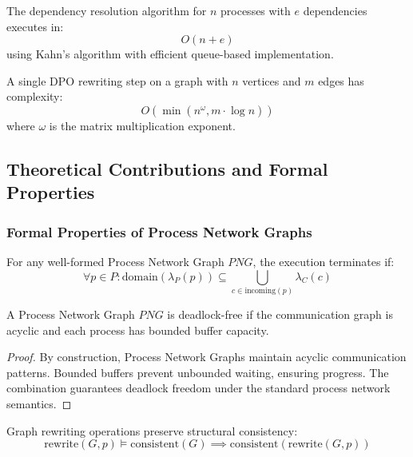 \documentclass[11pt,a4paper]{article}
\begin{document}
\begin{theorem}
The dependency resolution algorithm for $n$ processes with $e$ dependencies executes in:
\[
O(n + e)
\]
using Kahn's algorithm with efficient queue-based implementation.
\end{theorem}

\begin{theorem}
A single DPO rewriting step on a graph with $n$ vertices and $m$ edges has complexity:
\[
O\left(\min\left(n^{\omega}, m \cdot \log n\right)\right)
\]
where $\omega$ is the matrix multiplication exponent.
\end{theorem}

\subsection{Theoretical Contributions and Formal Properties}
\label{subsec:theoretical_contributions}

\subsubsection{Formal Properties of Process Network Graphs}
\label{subsubsec:formal_properties}

\begin{theorem}
For any well-formed Process Network Graph $PNG$, the execution terminates if:
\[
\forall p \in P: \text{domain}(\lambda_P(p)) \subseteq \bigcup_{c \in \text{incoming}(p)} \lambda_C(c)
\]
\end{theorem}

\begin{theorem}
A Process Network Graph $PNG$ is deadlock-free if the communication graph is acyclic and each process has bounded buffer capacity.
\end{theorem}

\begin{proof}
By construction, Process Network Graphs maintain acyclic communication patterns. Bounded buffers prevent unbounded waiting, ensuring progress. The combination guarantees deadlock freedom under the standard process network semantics.
\end{proof}

\begin{theorem}
Graph rewriting operations preserve structural consistency:
\[
\text{rewrite}(G, p) \models \text{consistent}(G) \implies \text{consistent}(\text{rewrite}(G, p))
\]
\end{theorem}
\end{document}
